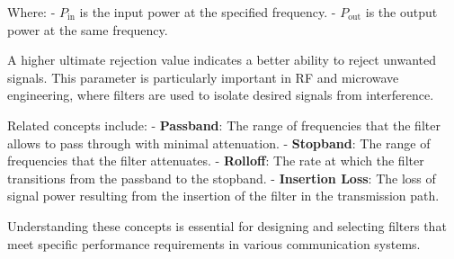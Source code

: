 Where:
- \( P_{\text{in}} \) is the input power at the specified frequency.
- \( P_{\text{out}} \) is the output power at the same frequency.

A higher ultimate rejection value indicates a better ability to reject unwanted signals. This parameter is particularly important in RF and microwave engineering, where filters are used to isolate desired signals from interference.

Related concepts include:
- \textbf{Passband}: The range of frequencies that the filter allows to pass through with minimal attenuation.
- \textbf{Stopband}: The range of frequencies that the filter attenuates.
- \textbf{Rolloff}: The rate at which the filter transitions from the passband to the stopband.
- \textbf{Insertion Loss}: The loss of signal power resulting from the insertion of the filter in the transmission path.

Understanding these concepts is essential for designing and selecting filters that meet specific performance requirements in various communication systems.

